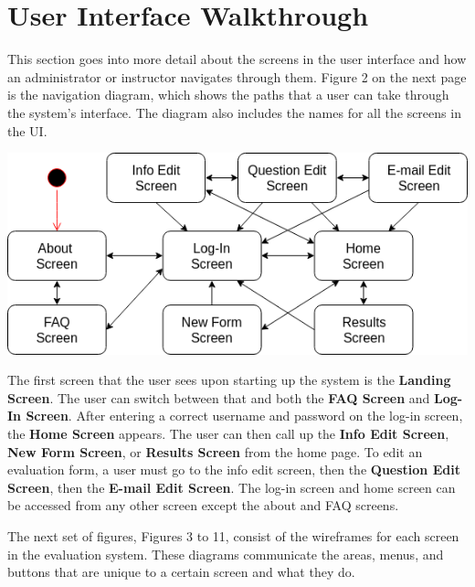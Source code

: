 \documentclass{article}
\begin{document}
\section{User Interface Walkthrough}

This section goes into more detail about the screens in the user interface and how an administrator or instructor navigates through them. Figure 2 on the next page is the navigation diagram, which shows the paths that a user can take through the system's interface. The diagram also includes the names for all the screens in the UI.

\newpage

\begin{center}
\vspace{3mm}
{\includegraphics[scale=0.6]{images/navigation_diagram.png}}
\vspace{2mm}
\end{center}

The first screen that the user sees upon starting up the system is the \textbf{Landing Screen}. The user can switch between that and both the \textbf{FAQ Screen} and  \textbf{Log-In Screen}. After entering a correct username and password on the log-in screen, the \textbf{Home Screen} appears. The user can then call up the \textbf{Info Edit Screen}, \textbf{New Form Screen}, or \textbf{Results Screen} from the home page. To edit an evaluation form, a user must go to the info edit screen, then the \textbf{Question Edit Screen}, then the \textbf{E-mail Edit Screen}. The log-in screen and home screen can be accessed from any other screen except the about and FAQ screens.

The next set of figures, Figures 3 to 11, consist of the wireframes for each screen in the evaluation system. These diagrams communicate the areas, menus, and buttons that are unique to a certain screen and what they do.

\newpage
{}
\end{document}
